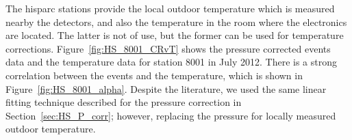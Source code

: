 %
%
%
%
%
%
%

The \gls{hisparc} stations provide the local outdoor temperature which is measured nearby the detectors, and also the temperature in the room where the electronics are located. The latter is not of use, but the former can be used for temperature corrections. Figure~\ref{fig:HS_8001_CRvT} shows the pressure corrected events data and the temperature data for station 8001 in July 2012. There is a strong correlation between the events and the temperature, which is shown in Figure~\ref{fig:HS_8001_alpha}. Despite the literature, we used the same linear fitting technique described for the pressure correction in Section~\ref{sec:HS_P_corr}; however, replacing the pressure for locally measured outdoor temperature.

